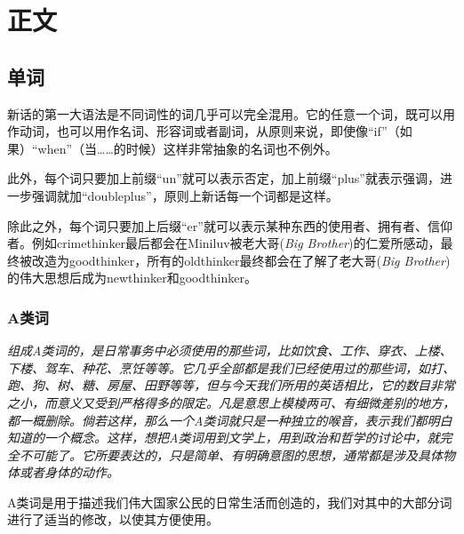 \documentclass[lang=cn, color=black]{elegantbook}
\newcommand{\bb}{老大哥(\textit{Big Brother})}
\begin{document}
    \part{正文}
        \chapter{单词}
            新话的第一大语法是不同词性的词几乎可以完全混用。它的任意一个词，既可以用作动词，也可以用作名词、形容词或者副词，从原则来说，即使像“if”（如果）“when”（当……的时候）这样非常抽象的名词也不例外。

            此外，每个词只要加上前缀“un”就可以表示否定，加上前缀“plus”就表示强调，进一步强调就加“doubleplus”，原则上新话每一个词都是这样。

            除此之外，每个词只要加上后缀“er”就可以表示某种东西的使用者、拥有者、信仰者。例如crimethinker最后都会在Miniluv被\bb 的仁爱所感动，最终被改造为goodthinker，所有的oldthinker最终都会在了解了\bb 的伟大思想后成为newthinker和goodthinker。

            \section{A类词}
                \textit{
                    组成A类词的，是日常事务中必须使用的那些词，比如饮食、工作、穿衣、上楼、下楼、驾车、种花、烹饪等等。它几乎全部都是我们已经使用过的那些词，如打、跑、狗、树、糖、房屋、田野等等，但与今天我们所用的英语相比，它的数目非常之小，而意义又受到严格得多的限定。凡是意思上模棱两可、有细微差别的地方，都一概删除。倘若这样，那么一个A类词就只是一种独立的喉音，表示我们都明白知道的一个概念。这样，想把A类词用到文学上，用到政治和哲学的讨论中，就完全不可能了。它所要表达的，只是简单、有明确意图的思想，通常都是涉及具体物体或者身体的动作。
                }


                A类词是用于描述我们伟大国家公民的日常生活而创造的，我们对其中的大部分词进行了适当的修改，以使其方便使用。
\end{document}
